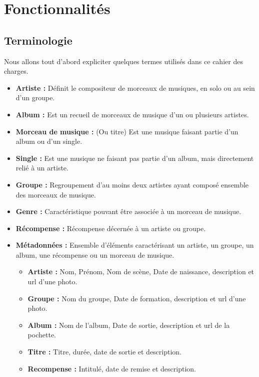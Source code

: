 \section{Fonctionnalités}

    \subsection{Terminologie}

        \begin{paragraphe}
            Nous allons tout d'abord expliciter quelques termes utilisés dans ce cahier des charges.
            \begin{itemize}
                \item \textbf{Artiste :} Définit le compositeur de morceaux de musiques, en solo ou au sein d'un groupe.
                \item \textbf{Album :} Est un recueil de morceaux de musique d'un ou plusieurs artistes.
                \item \textbf{Morceau de musique :} (Ou titre) Est une musique faisant partie d'un album ou d'un single.
                \item \textbf{Single :} Est une musique ne faisant pas partie d'un album, mais directement relié à un artiste.
                \item \textbf{Groupe :} Regroupement d'au moins deux artistes ayant composé ensemble des morceaux de musique.
                \item \textbf{Genre :} Caractéristique pouvant être associée à un morceau de musique.
                \item \textbf{Récompense :} Récompense décernée à un artiste ou groupe.
                \item \textbf{Métadonnées :} Ensemble d'éléments caractérisant un artiste, un groupe, un album, une récompense ou un morceau de musique.
                \begin{itemize}
                    \item \textbf{Artiste :} Nom, Prénom, Nom de scène, Date de naissance, description et url d'une photo.
                    \item \textbf{Groupe :} Nom du groupe, Date de formation, description et url d'une photo.
                    \item \textbf{Album :} Nom de l'album, Date de sortie, description et url de la pochette.
                    \item \textbf{Titre :} Titre, durée, date de sortie et description.
                    \item \textbf{Recompense :} Intitulé, date de remise et description.
                \end{itemize}
            \end{itemize}
        \end{paragraphe}

